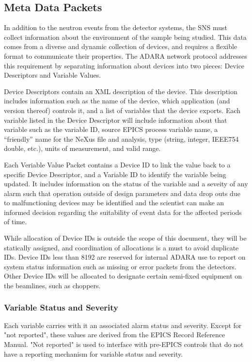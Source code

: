\newpage
\subsection{Meta Data Packets}
\label{section:protocol_meta_data_packets}

In addition to the neutron events from the detector systems, the SNS must
collect information about the environment of the sample being studied. This
data comes from a diverse and dynamic collection of devices, and requires
a flexible format to communicate their properties. The ADARA network
protocol addresses this requirement by separating information about devices
into two pieces: Device Descriptors and Variable Values.

Device Descriptors contain an XML description of the device. This description
includes information such as the name of the device, which application (and
version thereof) controls it, and a list of variables that the device exports.
Each variable listed in the Device Descriptor will include information about
that variable such as the variable ID, source EPICS process variable name, a
``friendly'' name for the NeXus file and analysis, type (string, integer,
IEEE754 double, etc.), units of measurement, and valid range.

Each Veriable Value Packet contains a Device ID to link the value back
to a specific Device Descriptor, and a Variable ID to identify the variable
being updated. It includes information on the status of the variable
and a seveity of any alarm such that operation outside of design parameters
and data drop outs due to malfunctioning devices may be identified and
the scientist can make an informed decision regarding the suitability
of event data for the affected periods of time.

While allocation of Device IDs is outside the scope of this document, they
will be statically assigned, and coordination of allocations is a must
to avoid duplicate IDs. Device IDs less than 8192 are reserved for
internal ADARA use to report on system status information such as missing
or error packets from the detectors. Other Device IDs will be allocated
to designate certain semi-fixed equipment on the beamlines, such as
choppers.


\newpage
\subsubsection{Variable Status and Severity}

Each variable carries with it an associated alarm status and severity.  Except
for "not reported", these values are derived from the EPICS Record Reference
Manual. "Not reported" is used to interface with pre-EPICS controls that
do not have a reporting mechanism for variable status and severity.

